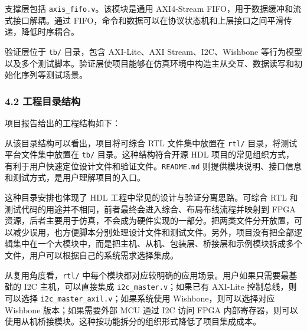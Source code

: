 支撑层包括 \texttt{axis\_fifo.v}。该模块是通用 AXI4-Stream FIFO，用于数据缓冲和流式接口解耦。通过 FIFO，命令和数据可以在协议状态机和上层接口之间平滑传递，降低时序耦合。

验证层位于 \texttt{tb/} 目录，包含 AXI-Lite、AXI Stream、I2C、Wishbone 等行为模型以及多个测试脚本。验证层使项目能够在仿真环境中构造主从交互、数据读写和初始化序列等测试场景。

\subsubsection{4.2 工程目录结构}\label{ux5de5ux7a0bux76eeux5f55ux7ed3ux6784}

项目报告给出的工程结构如下：

\begin{Shaded}
\begin{Highlighting}[]
\end{Highlighting}
\end{Shaded}

从该目录结构可以看出，项目将可综合 RTL 文件集中放置在 \texttt{rtl/} 目录，将测试平台文件集中放置在 \texttt{tb/} 目录。这种结构符合开源 HDL 项目的常见组织方式，有利于用户快速定位设计文件和验证文件。\texttt{README.md} 则提供模块说明、接口信息和测试方式，是用户理解项目的入口。

这种目录安排也体现了 HDL 工程中常见的设计与验证分离思路。可综合 RTL 和测试代码的用途并不相同，前者最终会进入综合、布局布线流程并映射到 FPGA 资源，后者主要用于仿真，不会成为硬件实现的一部分。把两类文件分开放置，可以减少误用，也方便脚本分别处理设计文件和测试文件。另外，项目没有把全部逻辑集中在一个大模块中，而是把主机、从机、包装层、桥接层和示例模块拆成多个文件，用户可以根据自己的系统需求选择集成。

从复用角度看，\texttt{rtl/} 中每个模块都对应较明确的应用场景。用户如果只需要最基础的 I2C 主机，可以直接集成 \texttt{i2c\_master.v}；如果已有 AXI-Lite 控制总线，则可以选择 \texttt{i2c\_master\_axil.v}；如果系统使用 Wishbone，则可以选择对应 Wishbone 版本；如果需要外部 MCU 通过 I2C 访问 FPGA 内部寄存器，则可以使用从机桥接模块。这种按功能拆分的组织形式降低了项目集成成本。

